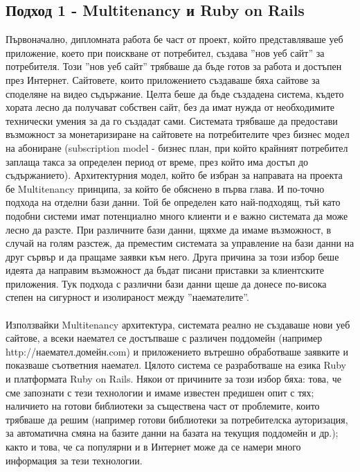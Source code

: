 \documentclass[pdftex,14pt,a4paper]{extreport}
\begin{document}
\subsection {Подход 1 - Multitenancy и Ruby on Rails}
Първоначално, дипломната работа бе част от проект, който представляваше уеб приложение, което при поискване от потребител, създава ''нов уеб сайт'' за потребителя. Този ''нов уеб сайт'' трябваше да бъде готов за работа и достъпен през Интернет. Сайтовете, които приложението създаваше бяха сайтове за споделяне на видео съдържание. Целта беше да бъде създадена система, където хората лесно да получават собствен сайт, без да имат нужда от необходимите технически умения за да го създадат сами. Системата трябваше да предостави възможност за монетаризиране на сайтовете на потребителите чрез бизнес модел на абониране (subscription model - бизнес план, при който крайният потребител заплаща такса за определен период от време, през който има достъп до съдържанието). Архитектурния модел, който бе избран за направата на проекта бе Multitenancy принципа, за който бе обяснено в първа глава. И по-точно подхода на отделни бази данни. Той бе определен като най-подходящ, тъй като подобни системи имат потенциално много клиенти и е важно системата да може лесно да разсте. При различните бази данни, щяхме да имаме възможност, в случай на голям разстеж, да преместим системата за управление на бази данни на друг сървър и да пращаме заявки към него. Друга причина за този избор беше идеята да направим възможност да бъдат писани приставки за клиентските приложения. Тук подхода с различни бази данни щеше да донесе по-висока степен на сигурност и изолираност между ''наемателите''. 
\paragraph {}

Използвайки Multitenancy архитектура, системата реално не създаваше нови уеб сайтове, а всеки наемател се достъпваше с различен поддомейн (например http://наемател.домейн.com) и приложението вътрешно обработваше заявките и показваше съответния наемател. Цялото система се разработваше на езика Ruby и платформата Ruby on Rails. Някои от причините за този избор бяха: това, че сме запознати с тези технологии и имаме известен предишен опит с тях; наличието на готови библиотеки за съществена част от проблемите, които трябваше да решим (например готови библиотеки за потребителска ауторизация, за автоматична смяна на базите данни на базата на текущия поддомейн и др.); както и това, че са популярни и в Интернет може да се намери много информация за тези технологии.
\end{document}
